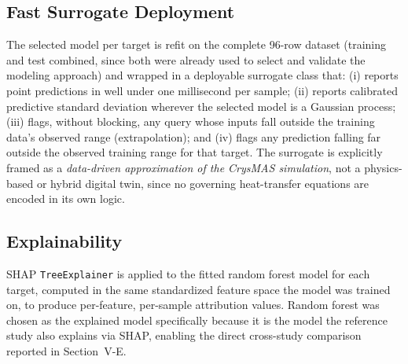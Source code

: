 \documentclass[conference]{IEEEtran}
\begin{document}
\subsection{Fast Surrogate Deployment}
The selected model per target is refit on the complete 96-row dataset (training and test combined, since both were already used to select and validate the modeling approach) and wrapped in a deployable surrogate class that: (i) reports point predictions in well under one millisecond per sample; (ii) reports calibrated predictive standard deviation wherever the selected model is a Gaussian process; (iii) flags, without blocking, any query whose inputs fall outside the training data's observed range (extrapolation); and (iv) flags any prediction falling far outside the observed training range for that target. The surrogate is explicitly framed as a \emph{data-driven approximation of the CrysMAS simulation}, not a physics-based or hybrid digital twin, since no governing heat-transfer equations are encoded in its own logic.

\subsection{Explainability}
SHAP \texttt{TreeExplainer} is applied to the fitted random forest model for each target, computed in the same standardized feature space the model was trained on, to produce per-feature, per-sample attribution values. Random forest was chosen as the explained model specifically because it is the model the reference study also explains via SHAP, enabling the direct cross-study comparison reported in Section~V-E.
\end{document}
